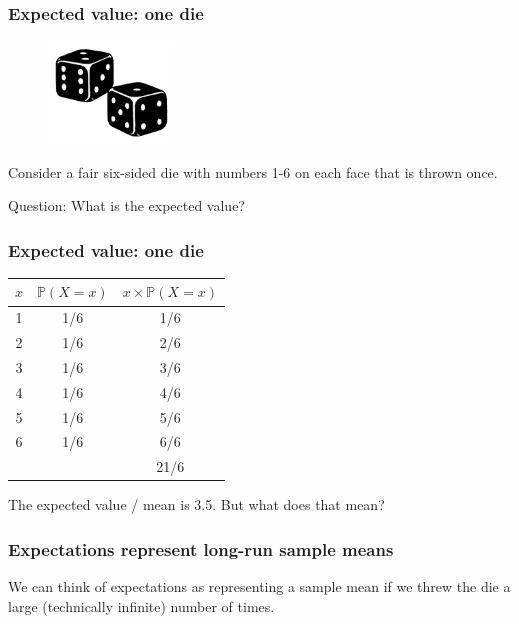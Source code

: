\documentclass{beamer}
\begin{document}
	\begin{frame}
		\frametitle{Expected value: one die}
		
		\begin{figure}[ht]
			\centerline{\includegraphics[width=0.3\textwidth]{./figures/dice.png}}
		\end{figure}
		
		Consider a fair six-sided die with numbers 1-6 on each face that is thrown once.
		
		
		Question: What is the expected value?
		
	\end{frame}
	
	\begin{frame}
		\frametitle{Expected value: one die}
		
		\begin{table}[]
			\begin{tabular}{ccc}
				$x$ & $\mathbb{P}(X=x)$ & $x \times \mathbb{P}(X=x)$ \\
				\midrule
				1 & 1/6     & 1/6       \\
				2 & 1/6     & 2/6       \\
				3 & 1/6     & 3/6       \\
				4 & 1/6     & 4/6       \\
				5 & 1/6     & 5/6       \\
				6 & 1/6     & 6/6       \\
				\midrule
				&         & 21/6
			\end{tabular}
		\end{table}
				
		The expected value / mean is 3.5. But what does that mean?
				
	\end{frame}

	\begin{frame}
		\frametitle{Expectations represent long-run sample means}
		
		We can think of expectations as representing a sample mean if we threw the die a large (technically infinite) number of times.
		
			\begin{figure}[t]
				\centerline{}
			\end{figure}
		
	\end{frame}
	
\end{document}
